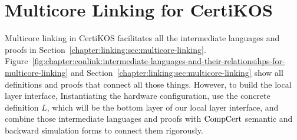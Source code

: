 \section{Multicore Linking for CertiKOS}
\label{chapter:certikos:sec:multicore-linking-for-certikos}

Multicore linking in CertiKOS facilitates all the intermediate languages
and proofs in Section~\ref{chapter:linking:sec:multicore-linking}.
Figure~\ref{fig:chapter:conlink:intermediate-languages-and-their-relationsihps-for-multicore-linking} and 
Section~\ref{chapter:linking:sec:multicore-linking} show all definitions and 
proofs that connect all those things. 
However, to build the local layer interface, 
Instantiating the hardware configuration, 
use the concrete definition $L$, which will be the 
bottom layer of our local layer interface, 
and combine those intermediate languages and proofs with $\mathrm{CompCert}$ semantic and backward simulation 
forms to connect them rigorously. 
